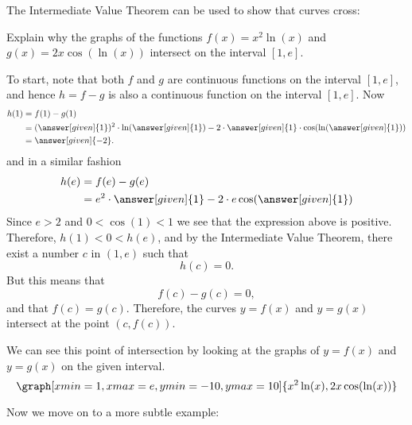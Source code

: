 \documentclass{ximera}
\begin{document}
The Intermediate Value Theorem can be used to show that curves cross:

\begin{example} 
	Explain why the graphs of the functions $f(x) = x^2\ln(x)$  and $ g(x) = 2x\cos(\ln(x))$ intersect on the interval $[1,e]$.
	\begin{explanation}
		  To start, note that both $f$ and $g$ are continuous functions on the interval $[1,e]$, and
		  hence $h = f-g$ is also a continuous function on the interval $[1,e]$. Now
		  \begin{align*}
		    h(1) &= f(1) - g(1) \\
		    &= (\answer[given]{1})^2\cdot \ln(\answer[given]{1}) - 2\cdot\answer[given]{1}\cdot \cos(\ln(\answer[given]{1}))\\
		    &= \answer[given]{-2}.
		  \end{align*}
		  and in a similar fashion
		   \begin{align*}
		    h(e) &= f(e) - g(e) \\
		    &= e^2\cdot \answer[given]{1} - 2\cdot e\cos(\answer[given]{1})
		   \end{align*}
		   Since $e>2$ and $0 < \cos(1)<1$ we see that the expression above is
		   positive. Therefore, $h(1)<0<h(e)$, and by the Intermediate Value Theorem, there exist a number $c$ in $(1,e)$ such that
		  \[h(c)=0.\]
		    But this means that 
		    \[ f(c)-g(c)=0, \]
		  and that $f(c)=g(c)$.
		  Therefore, the curves $y=f(x)$ and $y=g(x)$ intersect at the point $(c,f(c))$.
		  
		   \begin{onlineOnly}
		   We can see this point of intersection by looking at the graphs of $y=f(x)$ and $y=g(x)$ on the given interval. 
		   \[
		   \graph[xmin=1,xmax=e,ymin=-10,ymax=10]{x^2\ln(x), 2x\cos(\ln(x))}
		   \]
		   \end{onlineOnly}
  	\end{explanation}
\end{example}

Now we move on to a more subtle example:
\end{document}
